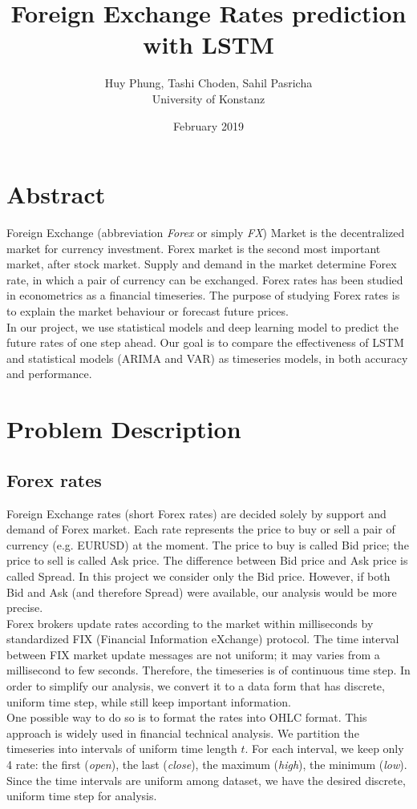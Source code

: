 \documentclass[11pt]{article}
\title{Foreign Exchange Rates prediction with LSTM}
\author{Huy Phung, Tashi Choden, Sahil Pasricha
  \\University of Konstanz}
\date{February 2019}
\begin{document}
\maketitle
\pagebreak
\tableofcontents
\pagebreak

\section{Abstract}
Foreign Exchange (abbreviation \textit{Forex} or simply \textit{FX}) Market is
the decentralized market for currency investment. Forex market is the second
most important market, after stock market. Supply and demand in the market
determine Forex rate, in which a pair of currency can be exchanged. Forex rates
has been studied in econometrics as a financial timeseries. The purpose of
studying Forex rates is to explain the market behaviour or forecast future
prices.\\
In our project, we use statistical models and deep learning model to predict the
future rates of one step ahead. Our goal is to compare the effectiveness of LSTM
and statistical models (ARIMA and VAR) as timeseries models, in both accuracy
and performance.


\section{Problem Description}
\subsection{Forex rates}
Foreign Exchange rates (short Forex rates) are decided solely by support and
demand of Forex market. Each rate represents the price to buy or sell a pair of
currency (e.g. EURUSD) at the moment. The price to buy is called Bid price; the
price to sell is called Ask price. The difference between Bid price and Ask
price is called Spread. In this project we consider only the Bid price. However,
if both Bid and Ask (and therefore Spread) were available, our analysis would be
more precise.\\
Forex brokers update rates according to the market within milliseconds by
standardized FIX (Financial Information eXchange) protocol. The time interval
between FIX market update messages are not uniform; it may varies from a
millisecond to few seconds. Therefore, the timeseries is of continuous time
step. In order to simplify our analysis, we convert it to a data form that has
discrete, uniform time step, while still keep important information.\\
One possible way to do so is to format the rates into OHLC format. This approach
is widely used in financial technical analysis. We partition the timeseries into
intervals of uniform time length $t$. For each interval, we keep only 4 rate:
the first (\textit{open}), the last (\textit{close}), the maximum
(\textit{high}), the minimum (\textit{low}). Since the time intervals are
uniform among dataset, we have the desired discrete, uniform time step for
analysis.
\end{document}
